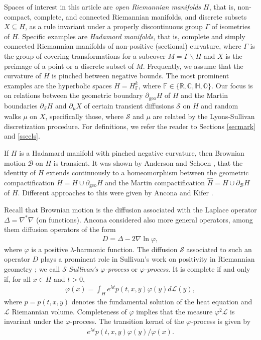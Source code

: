\documentclass[12pt,a4paper]{amsart}
\numberwithin{equation}{section}
\theoremstyle{definition}
\DeclareMathOperator{\geo}{geo}
\def\C{\mathbb C}
\def\F{\mathbb F}
\def\H{\mathbb H}
\def\O{\mathbb O}
\def\R{\mathbb R}
\def\vf{\varphi}
\begin{document}
Spaces of interest in this article are \emph{open Riemannian manifolds $H$},
that is, non-compact, complete, and connected Riemannian manifolds,
and discrete subsets $X\subseteq H$, as a rule invariant under a properly discontinuous group $\Gamma$ of isometries of $H$.
Specific examples are \emph{Hadamard manifolds}, that is, complete and simply connected Riemannian manifolds of non-positive (sectional) curvature, where $\Gamma$ is the group of covering transformations for a subcover $M=\Gamma\backslash H$ and $X$ is the preimage of a point or a discrete subset of $M$.
Frequently, we assume that the curvature of $H$ is pinched between negative bounds.
The most prominent examples are the hyperbolic spaces $H=H_\F^k$, where $\F\in\{\R,\C,\H,\O\}$.
Our focus is on relations between the geometric boundary $\partial_{\geo}H$ of $H$ and the Martin boundaries $\partial_{\mathcal{S}}H$  and $\partial_{\mu}X$ of certain transient diffusions $\mathcal{S}$ on $H$ and random walks $\mu$ on $X$, specifically those, where $\mathcal{S}$ and $\mu$ are related by the Lyons-Sullivan discretization procedure.
For definitions, we refer the reader to Sections \ref{secmark} and \ref{ssecls}.

If $H$ is a Hadamard manifold with pinched negative curvature, then Brownian motion $\mathcal B$ on $H$ is transient.
It was shown by Anderson and Schoen \cite{AS}, that the identity of $H$ extends continuously to a homeomorphism between the geometric compactification $\bar H=H\cup\partial_{\geo}H$ and the Martin compactification $\hat H=H\cup\partial_{\mathcal B}H$ of $H$.
Different approaches to this were given by Ancona and Kifer \cite{An,Ki}.

Recall that Brownian motion is the diffusion associated with the Laplace operator $\Delta=\nabla^*\nabla$ (on functions).
Ancona considered also more general operators, among them diffusion operators of the form
\begin{align}\label{diffoper}
    D = \Delta - 2\nabla\ln\vf,
\end{align}
where $\vf$ is a positive $\lambda$-harmonic function.
The diffusion $\mathcal{S}$ associated to such an operator $D$ plays a prominent role in Sullivan's work on positivity in Riemannian geometry \cite{Su3};
we call $\mathcal{S}$ \emph{Sullivan's $\vf$-process} or \emph{$\vf$-process}.
It is complete if and only if, for all $x\in H$ and $t>0$,
\begin{align}\label{complete}
	\vf(x) = \int_H e^{\lambda t} p(t,x,y) \vf(y) d\mathcal{L}(y),
\end{align}
where $p=p(t,x,y)$ denotes the fundamental solution of the heat equation and $\mathcal{L}$ Riemannian volume.
Completeness of $\vf$ implies that the measure $\vf^2\mathcal{L}$ is invariant under the $\vf$-process.
The transition kernel of the $\vf$-process is given by 
\begin{align}\label{sullivanpt}
    e^{\lambda t} p(t,x,y)\vf(y)/\vf(x).
\end{align}
\end{document}
